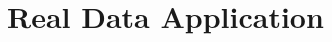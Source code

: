 \documentclass[12pt,letter]{article}\usepackage[]{graphicx}\usepackage[]{color}
\begin{document}

\section{Real Data Application}






\newpage
%
%


\end{document}
